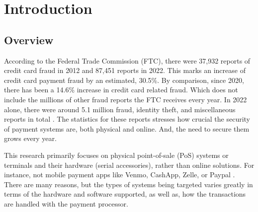 \chapter{\leavevmode Introduction}
\label{chap:introduction}

\section{Overview}  \label{overview}

According to the Federal Trade Commission (FTC), there were 37,932 reports of credit card fraud in 2012 and 87,451 reports in 2022. This marks an increase of credit card payment fraud by an estimated, 30.5\%. By comparison, since 2020, there has been a 14.6\% increase in credit card related fraud. Which does not include the millions of other fraud reports the FTC receives every year. In 2022 alone, there were around 5.1 million fraud, identity theft, and miscellaneous reports in total \autocite{ConsumerSentinelNetwork2023,forthesentinelConsumerSentinelNetwork2022}. The statistics for these reports stresses how crucial the security of payment systems are, both physical and online. And, the need to secure them grows every year.

This research primarily focuses on physical point-of-sale (PoS) systems or terminals and their hardware (serial accessories), rather than online solutions. For instance, not mobile payment apps like Venmo, CashApp, Zelle, or Paypal \autocite{wangMobilePaymentSecurity2016}. There are many reasons, but the types of systems being targeted varies greatly in terms of the hardware and software supported, as well as, how the transactions are handled with the payment processor.

